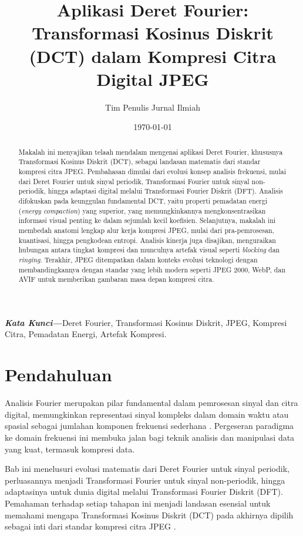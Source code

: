 \documentclass[a4paper]{article}
\title{\textbf{Aplikasi Deret Fourier: Transformasi Kosinus Diskrit (DCT) dalam Kompresi Citra Digital JPEG}}
\author{Tim Penulis Jurnal Ilmiah}
\date{\today}
\newcommand{\keywords}[1]{%
  \begin{center}
  \textbf{\textit{Kata Kunci---}}#1
  \end{center}
}
\begin{document}
\maketitle

\begin{abstract}
  Makalah ini menyajikan telaah mendalam mengenai aplikasi Deret Fourier, khususnya Transformasi Kosinus Diskrit (DCT), sebagai landasan matematis dari standar kompresi citra JPEG. Pembahasan dimulai dari evolusi konsep analisis frekuensi, mulai dari Deret Fourier untuk sinyal periodik, Transformasi Fourier untuk sinyal non-periodik, hingga adaptasi digital melalui Transformasi Fourier Diskrit (DFT). Analisis difokuskan pada keunggulan fundamental DCT, yaitu properti pemadatan energi (\textit{energy compaction}) yang superior, yang memungkinkannya mengkonsentrasikan informasi visual penting ke dalam sejumlah kecil koefisien. Selanjutnya, makalah ini membedah anatomi lengkap alur kerja kompresi JPEG, mulai dari pra-pemrosesan, kuantisasi, hingga pengkodean entropi. Analisis kinerja juga disajikan, menguraikan hubungan antara tingkat kompresi dan munculnya artefak visual seperti \textit{blocking} dan \textit{ringing}. Terakhir, JPEG ditempatkan dalam konteks evolusi teknologi dengan membandingkannya dengan standar yang lebih modern seperti JPEG 2000, WebP, dan AVIF untuk memberikan gambaran masa depan kompresi citra.
\end{abstract}

\keywords{Deret Fourier, Transformasi Kosinus Diskrit, JPEG, Kompresi Citra, Pemadatan Energi, Artefak Kompresi.}

\section{Pendahuluan}
Analisis Fourier merupakan pilar fundamental dalam pemrosesan sinyal dan citra digital, memungkinkan representasi sinyal kompleks dalam domain waktu atau spasial sebagai jumlahan komponen frekuensi sederhana \cite{oppenheim1996signals}. Pergeseran paradigma ke domain frekuensi ini membuka jalan bagi teknik analisis dan manipulasi data yang kuat, termasuk kompresi data.

Bab ini menelusuri evolusi matematis dari Deret Fourier untuk sinyal periodik, perluasannya menjadi Transformasi Fourier untuk sinyal non-periodik, hingga adaptasinya untuk dunia digital melalui Transformasi Fourier Diskrit (DFT). Pemahaman terhadap setiap tahapan ini menjadi landasan esensial untuk memahami mengapa Transformasi Kosinus Diskrit (DCT) pada akhirnya dipilih sebagai inti dari standar kompresi citra JPEG \cite{wallace1991jpeg}.
\end{document}
